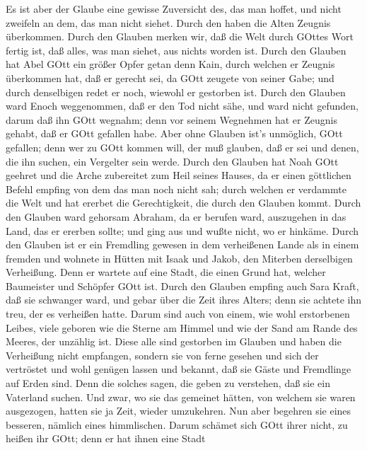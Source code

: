  Es ist aber der Glaube eine gewisse Zuversicht des, das man
hoffet, und nicht zweifeln an dem, das man nicht siehet. 
Durch den haben die Alten Zeugnis überkommen.  Durch den
Glauben merken wir, daß die Welt durch GOttes Wort fertig ist, daß
alles, was man siehet, aus nichts worden ist.  Durch den
Glauben hat Abel GOtt ein größer Opfer getan denn Kain, durch welchen er
Zeugnis überkommen hat, daß er gerecht sei, da GOtt zeugete von seiner
Gabe; und durch denselbigen redet er noch, wiewohl er gestorben ist.
 Durch den Glauben ward Enoch weggenommen, daß er den Tod
nicht sähe, und ward nicht gefunden, darum daß ihn GOtt wegnahm; denn
vor seinem Wegnehmen hat er Zeugnis gehabt, daß er GOtt gefallen habe.
 Aber ohne Glauben ist's unmöglich, GOtt gefallen; denn wer
zu GOtt kommen will, der muß glauben, daß er sei und denen, die ihn
suchen, ein Vergelter sein werde.  Durch den Glauben hat
Noah GOtt geehret und die Arche zubereitet zum Heil seines Hauses, da er
einen göttlichen Befehl empfing von dem das man noch nicht sah; durch
welchen er verdammte die Welt und hat ererbet die Gerechtigkeit, die
durch den Glauben kommt.  Durch den Glauben ward gehorsam
Abraham, da er berufen ward, auszugehen in das Land, das er ererben
sollte; und ging aus und wußte nicht, wo er hinkäme.  Durch
den Glauben ist er ein Fremdling gewesen in dem verheißenen Lande als in
einem fremden und wohnete in Hütten mit Isaak und Jakob, den Miterben
derselbigen Verheißung.  Denn er wartete auf eine Stadt,
die einen Grund hat, welcher Baumeister und Schöpfer GOtt ist.
 Durch den Glauben empfing auch Sara Kraft, daß sie
schwanger ward, und gebar über die Zeit ihres Alters; denn sie achtete
ihn treu, der es verheißen hatte.  Darum sind auch von
einem, wie wohl erstorbenen Leibes, viele geboren wie die Sterne am
Himmel und wie der Sand am Rande des Meeres, der unzählig ist.
 Diese alle sind gestorben im Glauben und haben die
Verheißung nicht empfangen, sondern sie von ferne gesehen und sich der
vertröstet und wohl genügen lassen und bekannt, daß sie Gäste und
Fremdlinge auf Erden sind.  Denn die solches sagen, die
geben zu verstehen, daß sie ein Vaterland suchen.  Und
zwar, wo sie das gemeinet hätten, von welchem sie waren ausgezogen,
hatten sie ja Zeit, wieder umzukehren.  Nun aber begehren
sie eines besseren, nämlich eines himmlischen. Darum schämet sich GOtt
ihrer nicht, zu heißen ihr GOtt; denn er hat ihnen eine Stadt
